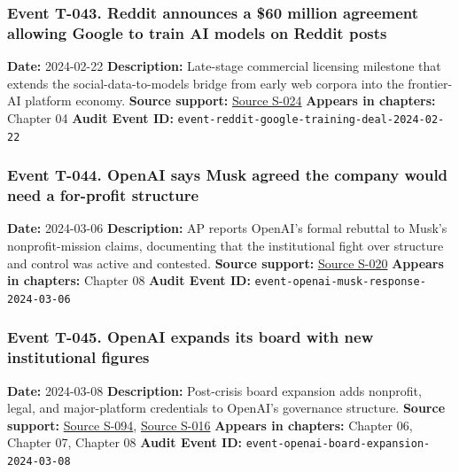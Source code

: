 \documentclass[
  american,
  11pt,
  letterpaper,
]{article}
\begin{document}
\subsubsection{Event T-043. Reddit announces a \$60 million agreement
allowing Google to train AI models on Reddit
posts}\label{event-t-043-reddit-announces-a-60-million-agreement-allowing-google-to-train-ai-models-on-reddit-posts}

\textbf{Date:} 2024-02-22 \textbf{Description:} Late-stage commercial
licensing milestone that extends the social-data-to-models bridge from
early web corpora into the frontier-AI platform economy. \textbf{Source
support:}
\hyperref[source-s-024-reddit-strikes-60m-deal-allowing-google-to-train-ai-models-on-its-posts-unveils-ipo-plans]{Source
S-024} \textbf{Appears in chapters:} Chapter 04 \textbf{Audit Event ID:}
\texttt{event-reddit-google-training-deal-2024-02-22}

\subsubsection{Event T-044. OpenAI says Musk agreed the company would
need a for-profit
structure}\label{event-t-044-openai-says-musk-agreed-the-company-would-need-a-for-profit-structure}

\textbf{Date:} 2024-03-06 \textbf{Description:} AP reports OpenAI's
formal rebuttal to Musk's nonprofit-mission claims, documenting that the
institutional fight over structure and control was active and contested.
\textbf{Source support:}
\hyperref[source-s-020-openai-says-musk-agreed-the-chatgpt-maker-should-become-a-for-profit-company]{Source
S-020} \textbf{Appears in chapters:} Chapter 08 \textbf{Audit Event ID:}
\texttt{event-openai-musk-response-2024-03-06}

\subsubsection{Event T-045. OpenAI expands its board with new
institutional
figures}\label{event-t-045-openai-expands-its-board-with-new-institutional-figures}

\textbf{Date:} 2024-03-08 \textbf{Description:} Post-crisis board
expansion adds nonprofit, legal, and major-platform credentials to
OpenAI's governance structure. \textbf{Source support:}
\hyperref[source-s-094-openai-announces-new-members-to-board-of-directors]{Source
S-094},
\hyperref[source-s-016-openai-has-full-confidence-in-ceo-sam-altman-after-investigation-reinstates-him-to-board]{Source
S-016} \textbf{Appears in chapters:} Chapter 06, Chapter 07, Chapter 08
\textbf{Audit Event ID:}
\texttt{event-openai-board-expansion-2024-03-08}
\end{document}
